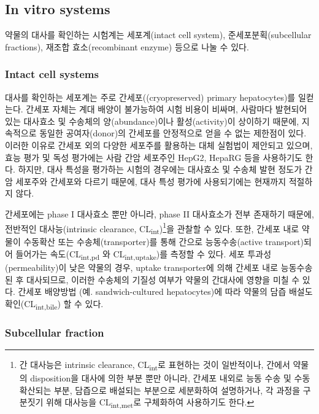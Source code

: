 \documentclass[
  11pt,
  krantz2, a4paper, twoside]{krantz}
\begin{document}
\subsection{In vitro systems}\label{in-vitro-systems}

약물의 대사를 확인하는 시험계는 세포계(intact cell system),
준세포분획(subcellular fractions), 재조합 효소(recombinant enzyme)
등으로 나눌 수 있다.

\subsubsection{Intact cell systems}\label{intact-cell-systems}

대사를 확인하는 세포계는 주로 간세포((cryopreserved) primary
hepatocytes)를 일컫는다. 간세포 자체는 계대 배양이 불가능하여 시험
비용이 비싸며, 사람마다 발현되어 있는 대사효소 및 수송체의
양(abundance)이나 활성(activity)이 상이하기 때문에, 지속적으로 동일한
공여자(donor)의 간세포를 안정적으로 얻을 수 없는 제한점이 있다. 이러한
이유로 간세포 외의 다양한 세포주를 활용하는 대체 실험법이 제안되고
있으며, 효능 평가 및 독성 평가에는 사람 간암 세포주인 HepG2, HepaRG 등을
사용하기도 한다. 하지만, 대사 특성을 평가하는 시험의 경우에는 대사효소
및 수송체 발현 정도가 간암 세포주와 간세포와 다르기 때문에, 대사 특성
평가에 사용되기에는 현재까지 적절하지 않다.

간세포에는 phase I 대사효소 뿐만 아니라, phase II 대사효소가 전부
존재하기 때문에, 전반적인 대사능(intrinsic clearance, CL\textsubscript{int})\footnote{간 대사능은 intrinsic clearance, CL\textsubscript{int}로 표현하는 것이 일반적이나, 간에서 약물의 disposition을 대사에 의한 부분 뿐만 아니라, 간세포 내외로 능동 수송 및 수동 확산되는 부분, 담즙으로 배설되는 부분으로 세분화하여 설명하거나, 각 과정을 구분짓기 위해 대사능을 CL\textsubscript{int,met}로 구체화하여 사용하기도 한다.}을
관찰할 수 있다. 또한, 간세포 내로 약물이 수동확산 또는
수송체(transporter)를 통해 간으로 능동수송(active transport)되어
들어가는 속도(CL\textsubscript{int,pd} 와 CL\textsubscript{int,uptake})를 측정할 수 있다. 세포
투과성(permeability)이 낮은 약물의 경우, uptake transporter에 의해
간세포 내로 능동수송 된 후 대사되므로, 이러한 수송체의 기질성 여부가
약물의 간대사에 영향을 미칠 수 있다. 간세포 배양방법 (예.
sandwich-cultured hepatocytes)에 따라 약물의 담즙 배설도
확인(CL\textsubscript{int,bile}) 할 수 있다.

\subsubsection{Subcellular fraction}\label{subcellular-fraction}
\end{document}

